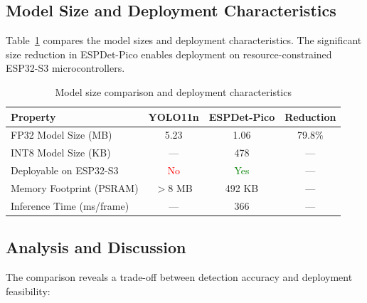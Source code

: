 \documentclass[12pt,a4paper]{article}
\begin{document}
\subsection*{Model Size and Deployment Characteristics}

Table~\ref{tab:model_size} compares the model sizes and deployment characteristics. The significant size reduction in ESPDet-Pico enables deployment on resource-constrained ESP32-S3 microcontrollers.

\begin{table}[H]
\centering
\caption{Model size comparison and deployment characteristics}
\label{tab:model_size}
\begin{tabular}{lccc}
\toprule
\textbf{Property} & \textbf{YOLO11n} & \textbf{ESPDet-Pico} & \textbf{Reduction} \\
\midrule
FP32 Model Size (MB)        & 5.23  & 1.06  & 79.8\% \\
INT8 Model Size (KB)        & ---   & 478   & --- \\
\midrule
Deployable on ESP32-S3      & \textcolor{red}{No}  & \textcolor{green}{Yes} & --- \\
Memory Footprint (PSRAM)    & $>$8 MB & 492 KB & --- \\
Inference Time (ms/frame)   & ---   & 366    & --- \\
\bottomrule
\end{tabular}
\end{table}

\subsection*{Analysis and Discussion}

The comparison reveals a trade-off between detection accuracy and deployment feasibility:
\end{document}
